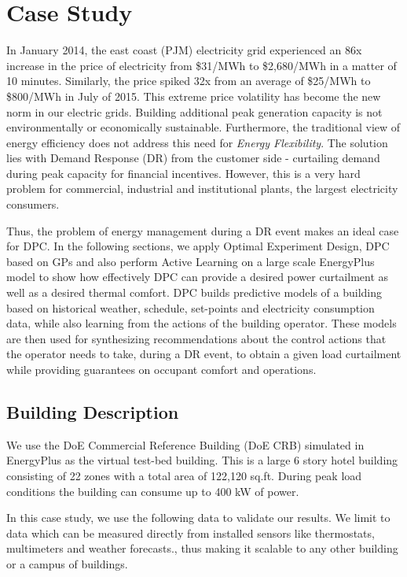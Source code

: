 \section{Case Study}
\label{S:casestudy}


In January 2014, the east coast (PJM) electricity grid experienced an 86x increase in the price of electricity from \$31/MWh to \$2,680/MWh in a matter of 10 minutes. Similarly, the price spiked 32x from an average of \$25/MWh to \$800/MWh in July of 2015. This extreme price volatility has become the new norm in our electric grids. Building additional peak generation capacity is not environmentally or economically sustainable. Furthermore, the traditional view of energy efficiency does not address this need for \emph{Energy Flexibility}. The solution lies with Demand Response (DR) from the customer side - curtailing demand during peak capacity for financial incentives. However, this is a very hard problem for commercial, industrial and institutional plants, the largest electricity consumers.

Thus, the problem of energy management during a DR event makes an ideal case for DPC. In the following sections, we apply Optimal Experiment Design, DPC based on GPs and also perform Active Learning on a large scale EnergyPlus model to show how effectively DPC can provide a desired power curtailment as well as a desired thermal comfort. DPC builds predictive models of a building based on historical weather, schedule, set-points and electricity consumption data, while also learning from the actions of the building operator. These models are then used for synthesizing recommendations about the control actions that the operator needs to take, during a DR event, to obtain a given load curtailment while providing guarantees on occupant comfort and operations.

\subsection{Building Description}
We use the DoE Commercial Reference Building (DoE CRB) simulated in EnergyPlus \cite{Deru2011} as the virtual test-bed building.
This is a large 6 story hotel building consisting of 22 zones with a total area of 122,120 sq.ft. 
During peak load conditions the building can consume up to 400 kW of power. 

In this case study, we use the following data to validate our results. We limit to data which can be measured directly from installed sensors like thermostats, multimeters and weather forecasts., thus making it scalable to any other building or a campus of buildings.

